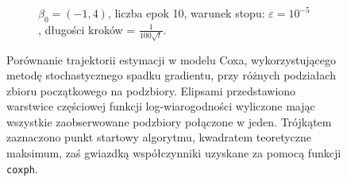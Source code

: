 \begin{figure}[hbt!]
\begin{center}
\begin{subfigure}[h!]{0.9\textwidth}
            \caption{$\beta_0=(-1,4)$, liczba epok 10, warunek stopu: $\varepsilon=10^{-5}$, długości kroków = $\frac{1}{100\sqrt{t}}$.}
   \end{subfigure}  
      \end{center}
  \caption[Porównanie estymacji w modelu Coxa metodą stochastycznego spadku gradientu dla różnych podziałów zbioru początkowego na podzbiory.]{\label{rysCox3}Porównanie trajektorii estymacji w modelu Coxa, wykorzystującego metodę stochastycznego spadku gradientu, przy różnych podziałach zbioru początkowego na podzbiory. Elipsami przedstawiono warstwice częściowej funkcji log-wiarogodności wyliczone mając wszystkie zaobserwowane podzbiory połączone w jeden. Trójkątem zaznaczono punkt startowy algorytmu, kwadratem teoretyczne maksimum, zaś gwiazdką współczynniki uzyskane za pomocą funkcji \texttt{coxph}.}
\end{figure}



